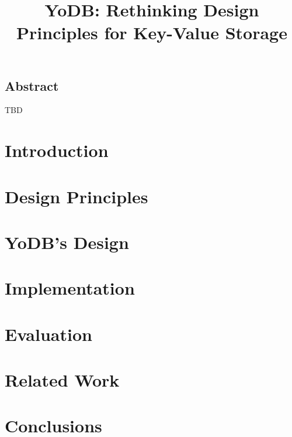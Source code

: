 \documentclass[letterpaper,twocolumn,10pt]{article}
\date{}
\newcommand{\sys}{YoDB}
\begin{document}
\title{\Large \bf \sys: Rethinking Design Principles for Key-Value Storage} 
\author{}
\maketitle

\subsection*{Abstract}

TBD

\section{Introduction}


\section{Design Principles}
\label{sec:principles}


\section{\sys's Design}
\label{sec:design}


\section{Implementation}
\label{sec:impl}


\section{Evaluation}
\label{sec:eval}


\section{Related Work}
\label{sec:related}


\section{Conclusions}
\label{sec:conclusions}


%

{\normalsize 
}

\end{document}
